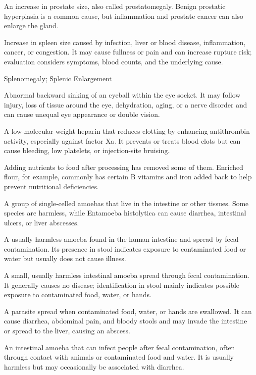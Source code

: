  An increase in prostate size, also called prostatomegaly. Benign prostatic hyperplasia is a common cause, but inflammation and prostate cancer can also enlarge the gland.

 Increase in spleen size caused by infection, liver or blood disease, inflammation, cancer, or congestion. It may cause fullness or pain and can increase rupture risk; evaluation considers symptoms, blood counts, and the underlying cause.

\synonyms
Splenomegaly; Splenic Enlargement

 Abnormal backward sinking of an eyeball within the eye socket. It may follow injury, loss of tissue around the eye, dehydration, aging, or a nerve disorder and can cause unequal eye appearance or double vision.

 A low-molecular-weight heparin that reduces clotting by enhancing antithrombin activity, especially against factor Xa. It prevents or treats blood clots but can cause bleeding, low platelets, or injection-site bruising.

 Adding nutrients to food after processing has removed some of them. Enriched flour, for example, commonly has certain B vitamins and iron added back to help prevent nutritional deficiencies.

 A group of single-celled amoebas that live in the intestine or other tissues. Some species are harmless, while Entamoeba histolytica can cause diarrhea, intestinal ulcers, or liver abscesses.

 A usually harmless amoeba found in the human intestine and spread by fecal contamination. Its presence in stool indicates exposure to contaminated food or water but usually does not cause illness.

 A small, usually harmless intestinal amoeba spread through fecal contamination. It generally causes no disease; identification in stool mainly indicates possible exposure to contaminated food, water, or hands.

 A parasite spread when contaminated food, water, or hands are swallowed. It can cause diarrhea, abdominal pain, and bloody stools and may invade the intestine or spread to the liver, causing an abscess.

 An intestinal amoeba that can infect people after fecal contamination, often through contact with animals or contaminated food and water. It is usually harmless but may occasionally be associated with diarrhea.

